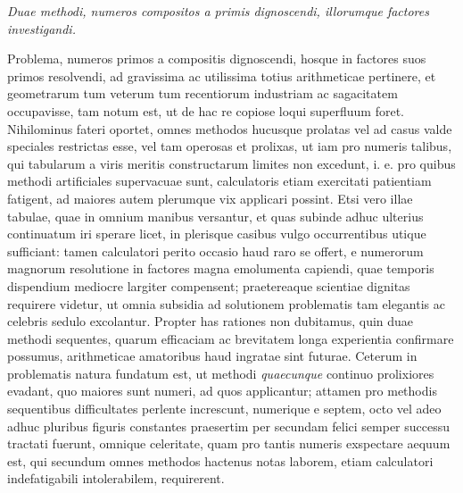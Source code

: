 \begin{center}\textit{Duae methodi, numeros compositos a primis dignoscendi, illorumque factores investigandi.}\end{center}


Problema, numeros primos a compositis dignoscendi, hosque in factores suos primos resolvendi, ad gravissima ac utilissima totius arithmeticae pertinere, et geometrarum tum veterum tum recentiorum industriam ac sagacitatem occupavisse, tam notum est, ut de hac re copiose loqui superfluum foret. Nihilominus fateri oportet, omnes methodos hucusque prolatas vel ad casus valde speciales restrictas esse, vel tam operosas et prolixas, ut iam pro numeris talibus, qui tabularum a viris meritis constructarum limites non excedunt, i. e. pro quibus methodi artificiales supervacuae sunt, calculatoris etiam exercitati patientiam fatigent, ad maiores autem plerumque vix applicari possint. Etsi vero illae tabulae, quae in omnium manibus versantur, et quas subinde adhuc ulterius continuatum iri sperare licet, in plerisque casibus vulgo occurrentibus utique sufficiant: tamen calculatori perito occasio haud raro se offert, e numerorum magnorum resolutione in factores magna emolumenta capiendi, quae temporis dispendium mediocre largiter compensent; praetereaque scientiae dignitas requirere videtur, ut omnia subsidia ad solutionem problematis tam elegantis ac celebris sedulo excolantur. Propter has rationes non
dubitamus, quin duae methodi sequentes, quarum efficaciam ac brevitatem longa experientia confirmare possumus, arithmeticae amatoribus haud ingratae sint futurae. Ceterum in problematis natura fundatum est, ut methodi \textit{quaecunque} continuo prolixiores evadant, quo maiores sunt numeri, ad quos applicantur; attamen pro methodis sequentibus difficultates perlente increscunt, numerique e septem, octo vel adeo adhuc pluribus figuris constantes praesertim per secundam felici semper successu tractati fuerunt, omnique celeritate, quam pro tantis numeris exspectare aequum est, qui secundum omnes methodos hactenus notas laborem, etiam calculatori indefatigabili intolerabilem, requirerent.

